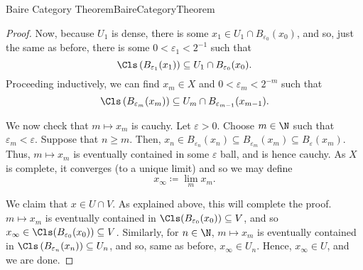 \begin{thm}{Baire Category Theorem}{BaireCategoryTheorem}
\begin{proof}
Now, because $U_1$ is dense, there is some $x_1\in U_1\cap B_{\varepsilon _0}(x_0)$, and so, just the same as before, there is some $0<\varepsilon _1<2^{-1}$ such that
\begin{equation}
\Cls \left( B_{\varepsilon _1}(x_1)\right) \subseteq U_1\cap B_{\varepsilon _0}(x_0).
\end{equation}
Proceeding inductively, we can find $x_m\in X$ and $0<\varepsilon _m<2^{-m}$ such that
\begin{equation}
\Cls \left( B_{\varepsilon _m}(x_m)\right) \subseteq U_m\cap B_{\varepsilon _{m-1}}(x_{m-1}).
\end{equation}

We now check that $m\mapsto x_m$ is cauchy.  Let $\varepsilon >0$.  Choose $m\in \N$ such that $\varepsilon _m<\varepsilon$.  Suppose that $n\geq m$.  Then, $x_n\in B_{\varepsilon _n}(x_n)\subseteq B_{\varepsilon _m}(x_m)\subseteq B_{\varepsilon}(x_m)$.  Thus, $m\mapsto x_m$ is eventually contained in some $\varepsilon$ ball, and is hence cauchy.  As $X$ is complete, it converges (to a unique limit) and so we may define
\begin{equation}
x_\infty \coloneqq \lim _mx_m.
\end{equation}

We claim that $x\in U\cap V$.  As explained above, this will complete the proof.  $m\mapsto x_m$ is eventually contained in $\Cls (B_{\varepsilon _0}(x_0))\subseteq V$, and so $x_\infty \in \Cls (B_{\varepsilon _0}(x_0))\subseteq V$.  Similarly, for $n\in \N$, $m\mapsto x_m$ is eventually contained in $\Cls \left( B_{\varepsilon _n}(x_n)\right) \subseteq U_n$, and so, same as before, $x_\infty \in U_n$.  Hence, $x_\infty \in U$, and we are done.
\end{proof}
\end{thm}

